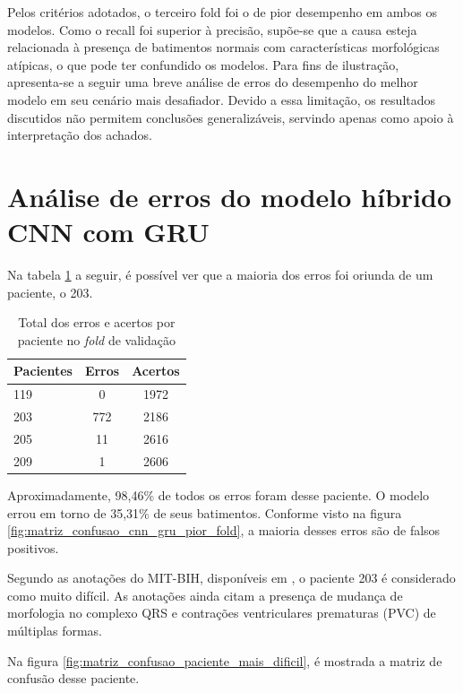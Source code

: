 Pelos critérios adotados, o terceiro fold foi o de pior desempenho em ambos os modelos.
Como o recall foi superior à precisão, supõe-se que a causa esteja relacionada à presença de batimentos normais com características morfológicas atípicas, o que pode ter confundido os modelos.
Para fins de ilustração, apresenta-se a seguir uma breve análise de erros do desempenho do melhor modelo em seu cenário mais desafiador.
Devido a essa limitação, os resultados discutidos não permitem conclusões generalizáveis, servindo apenas como apoio à interpretação dos achados.

\section{Análise de erros do modelo híbrido CNN com GRU}
\label{sec:analise_erros_cnn_gru}

Na tabela \ref{tab:erros_acertos_por_paciente} a seguir, é possível ver que a maioria dos erros foi oriunda de um paciente, o 203.

\begin{table}[H]
\centering
\caption{Total dos erros e acertos por paciente no \textit{fold} de validação}
\label{tab:erros_acertos_por_paciente}
\begin{tabular}{lcc}
\hline
\textbf{Pacientes} & \textbf{Erros} & \textbf{Acertos}\\
\hline
119 & 0 &  1972 \\
203 & 772  & 2186\\
205 & 11 & 2616\\
209 & 1 & 2606\\
\hline
\end{tabular}
\end{table}

Aproximadamente, 98,46\% de todos os erros foram desse paciente. O modelo errou em torno de 35,31\% de seus batimentos. Conforme visto na 
figura \ref{fig:matriz_confusao_cnn_gru_pior_fold}, a maioria desses erros são de falsos positivos.

Segundo as anotações do MIT-BIH, disponíveis em \cite{physionet_annotations}, o paciente 203 é considerado como muito difícil. As anotações ainda citam
a presença de mudança de morfologia no complexo QRS e contrações ventriculares prematuras (PVC) de múltiplas formas.

Na figura \ref{fig:matriz_confusao_paciente_mais_dificil}, é mostrada a matriz de confusão desse paciente.

